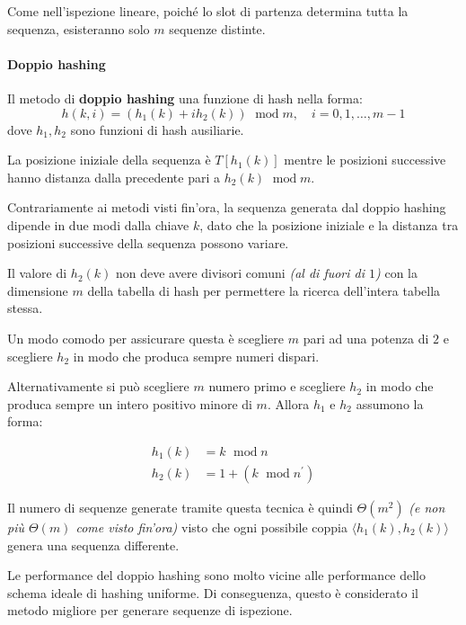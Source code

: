 \documentclass[italian, 10pt]{article}
\DeclareMathOperator{\modop}{\ mod}
\begin{document}
Come nell'ispezione lineare, poiché lo slot di partenza determina tutta la sequenza, esisteranno solo \(m\) sequenze distinte.

\paragraph{Doppio hashing}

Il metodo di \textbf{doppio hashing} una funzione di hash nella forma:
\[ h(k, i) = \left(h_1(k) + i h_2(k)\right) \modop m, \quad i = 0, 1, \ldots, m-1 \]
dove \(h_1, h_2\) sono funzioni di hash ausiliarie.

La posizione iniziale della sequenza è \(T\left[h_1(k)\right]\) mentre le posizioni successive hanno distanza dalla precedente pari a \(h_2(k) \modop m\).

\bigskip
Contrariamente ai metodi visti fin'ora, la sequenza generata dal doppio hashing dipende in due modi dalla chiave \(k\), dato che la posizione iniziale e la distanza tra posizioni successive della sequenza possono variare.

Il valore di \(h_2(k)\) non deve avere divisori comuni \textit{(al di fuori di \(1\))} con la dimensione \(m\) della tabella di hash per permettere la ricerca dell'intera tabella stessa.

Un modo comodo per assicurare questa è scegliere \(m\) pari ad una potenza di \(2\) e scegliere \(h_2\) in modo che produca sempre numeri dispari.

Alternativamente si può scegliere \(m\) numero primo e scegliere \(h_2\) in modo che produca sempre un intero positivo minore di \(m\).
Allora \(h_1\) e \(h_2\) assumono la forma:

\begin{align*}
  h_1(k) & = k \modop n                         \\
  h_2(k) & = 1 + \left(k \modop n^\prime\right)
\end{align*}

\bigskip
Il numero di sequenze generate tramite questa tecnica è quindi \(\Theta(m^2)\) \textit{(e non più \(\Theta(m)\) come visto fin'ora)} visto che ogni possibile coppia \(\langle h_1(k), h_2(k) \rangle\) genera una sequenza differente.

Le performance del doppio hashing sono molto vicine alle performance dello schema ideale di hashing uniforme.
Di conseguenza, questo è considerato il metodo migliore per generare sequenze di ispezione.

\clearpage
\end{document}

